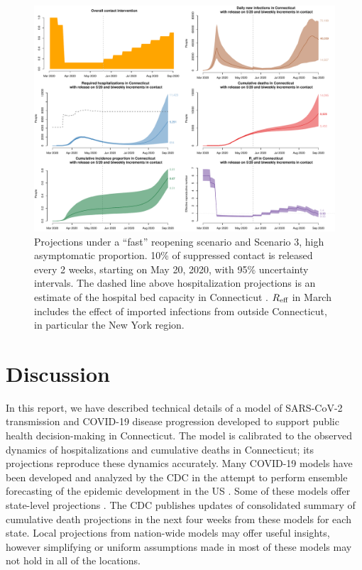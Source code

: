 \documentclass[11pt]{article}
\begin{document}
\begin{figure} %
	\centering
	\includegraphics[width=.9\textwidth]{figures/fast_high_full.pdf}
	\caption{Projections under a ``fast'' reopening scenario and Scenario 3, high asymptomatic proportion. 10\% of suppressed contact is released every 2 weeks, starting on May 20, 2020, with 95\% uncertainty intervals. The dashed line above hospitalization projections is an estimate of the hospital bed capacity in Connecticut \citep{CHAwebsite}. $R\textsubscript{eff}$ in March includes the effect of imported infections from outside Connecticut, in particular the New York region.}
	\label{fig:fast_high}
\end{figure}









\section{Discussion}

In this report, we have described technical details of a model of SARS-CoV-2 transmission and COVID-19 disease progression developed to support public health decision-making in Connecticut.  The model is calibrated to the observed dynamics of hospitalizations and cumulative deaths in Connecticut; its projections reproduce these dynamics accurately.  Many COVID-19 models have been developed and analyzed by the CDC in the attempt to perform ensemble forecasting of the epidemic development in the US \citep{cdc2020covid19forecasts}. Some of these models offer state-level projections \citep{imperial2020state, covidactnow2020you, gleam2020projections, columbia2020projections, ihme2020projections, losalamos2020projections, mit2020projections, ucla2020projections, umassamherst2020projections, utaustin2020projections, yyg2020projections}.  The CDC publishes updates of consolidated summary of cumulative death projections in the next four weeks from these models for each state. Local projections from nation-wide models may offer useful insights, however simplifying or uniform assumptions made in most of these models may not hold in all of the locations. 
\end{document}

